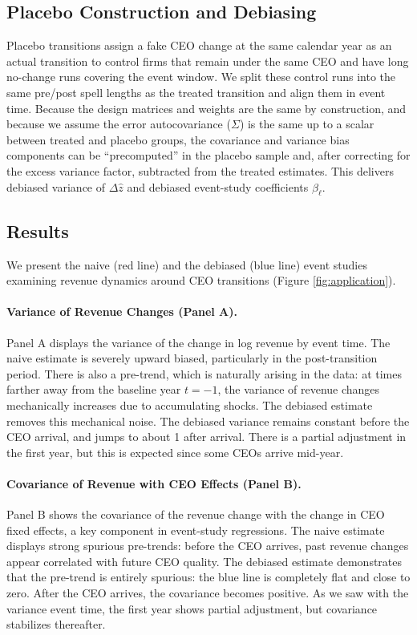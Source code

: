 \documentclass[11pt,a4paper]{article}
\begin{document}
\subsection*{Placebo Construction and Debiasing}
Placebo transitions assign a fake CEO change at the same calendar year as an actual transition to control firms that remain under the same CEO and have long no-change runs covering the event window. We split these control runs into the same pre/post spell lengths as the treated transition and align them in event time. Because the design matrices and weights are the same by construction, and because we assume the error autocovariance (\(\Sigma\)) is the same up to a scalar between treated and placebo groups, the covariance and variance bias components can be ``precomputed'' in the placebo sample and, after correcting for the excess variance factor, subtracted from the treated estimates. This delivers debiased variance of \(\Delta \hat z\) and debiased event-study coefficients \(\beta_{\ell}\).


\subsection*{Results}

We present the naive (red line) and the debiased (blue line) event studies examining revenue dynamics around CEO transitions (Figure \ref{fig:application}). 

\paragraph{Variance of Revenue Changes (Panel A).} Panel A displays the variance of the change in log revenue by event time. The naive estimate is severely upward biased, particularly in the post-transition period. There is also a pre-trend, which is naturally arising in the data: at times farther away from the baseline year $t=-1$, the variance of revenue changes mechanically increases due to accumulating shocks. The debiased estimate  removes this mechanical noise. The debiased variance remains constant before the CEO arrival, and jumps to about 1 after arrival. There is a partial adjustment in the first year, but this is expected since some CEOs arrive mid-year. 

\paragraph{Covariance of Revenue with CEO Effects (Panel B).} Panel B shows the covariance of the revenue change with the change in CEO fixed effects, a key component in event-study regressions. The naive estimate displays strong spurious pre-trends: before the CEO arrives, past revenue changes appear correlated with future CEO quality. The debiased estimate demonstrates that the pre-trend is entirely spurious: the blue line is completely flat and close to zero. After the CEO arrives, the covariance becomes positive. As we saw with the variance event time, the first year shows partial adjustment, but covariance stabilizes thereafter.
\end{document}
